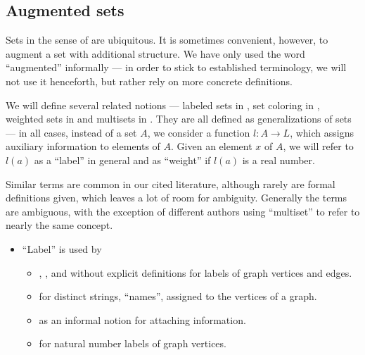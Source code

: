 \subsection{Augmented sets}\label{subsec:augmented_sets}

Sets in the sense of  are ubiquitous. It is sometimes convenient, however, to augment a set with additional structure. We have only used the word \enquote{augmented} informally --- in order to stick to established terminology, we will not use it henceforth, but rather rely on more concrete definitions.

\begin{remark}\label{rem:set_labeling_terminology}
  We will define several related notions --- labeled sets in , set coloring in , weighted sets in  and multisets in . They are all defined as generalizations of sets --- in all cases, instead of a set \( A \), we consider a function \( l: A \to L \), which assigns auxiliary information to elements of \( A \). Given an element \( x \) of \( A \), we will refer to \( l(a) \) as a \enquote{label} in general and as \enquote{weight} if \( l(a) \) is a real number.

  Similar terms are common in our cited literature, although rarely are formal definitions given, which leaves a lot of room for ambiguity. Generally the terms are ambiguous, with the exception of different authors using \enquote{multiset} to refer to nearly the same concept.

  \begin{itemize}
    \item \enquote{Label} is used by
    \begin{itemize}
      \item {},  ,  and  without explicit definitions for labels of graph vertices and edges.

      \item {} for distinct strings, \enquote{names}, assigned to the vertices of a graph.

      \item {} as an informal notion for attaching information.

      \item {} for natural number labels of graph vertices.
    \end{itemize}


\end{itemize}
\end{remark}
